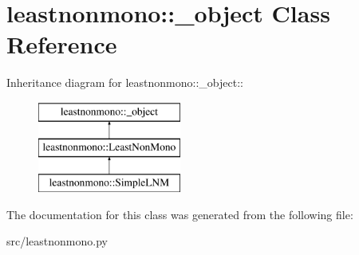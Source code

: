 \hypertarget{classleastnonmono_1_1__object}{
\section{leastnonmono::\_\-object Class Reference}
\label{d0/dee/classleastnonmono_1_1__object}
}
Inheritance diagram for leastnonmono::\_\-object::\begin{figure}[H]
\begin{center}
\leavevmode
\includegraphics[height=3cm]{d0/dee/classleastnonmono_1_1__object}
\end{center}
\end{figure}


The documentation for this class was generated from the following file:\begin{DoxyCompactItemize}
\item 
src/leastnonmono.py\end{DoxyCompactItemize}
